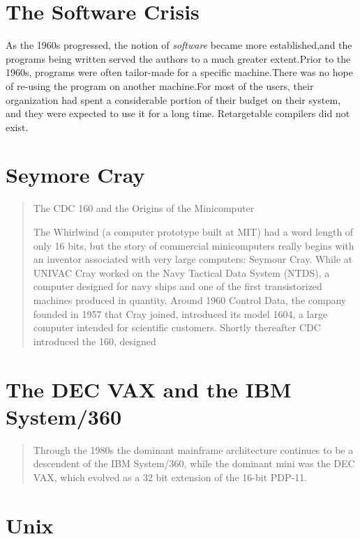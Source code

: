 \section{The Software Crisis}
As the 1960s progressed, 
the notion of 
\textit{software} became more established,and the programs being written served the authors to a 
much greater extent.Prior to the 1960s, programs were often tailor-made for a specific 
machine.There was no hope of re-using the program on another machine.For most of the users, their 
organization had spent a considerable portion of their budget on their system, and they were 
expected to use it for a long time. Retargetable compilers did not exist.

\section{Seymore Cray}
\begin{quotation}
    The CDC 160 and the Origins of the Minicomputer
    
    The Whirlwind (a computer prototype built at 
MIT) had a word length of only 16 bits, but the story of commercial minicomputers really begins with 
an inventor associated with very large computers: Seymour Cray. While at UNIVAC Cray worked on the 
Navy Tactical Data System (NTDS), a computer designed for navy ships and one of the first 
transistorized machines produced in quantity. Around 1960 Control Data, the company founded in 1957 
that Cray joined, introduced its model 1604, a large computer intended for scientific customers. 
Shortly thereafter CDC introduced the 160, designed
\cite{nothing_new_since_von_neumann_2000}
\end{quotation}
\section{The DEC VAX and the IBM System/360}
\begin{quotation}
    Through the 1980s the dominant mainframe architecture continues to be a descendent of the IBM 
System/360, while the dominant mini was the DEC VAX, which evolved as a 32 bit extension of the 
16-bit PDP-11.
\cite{nothing_new_since_von_neumann_2000}
\end{quotation}

\section{Unix}

